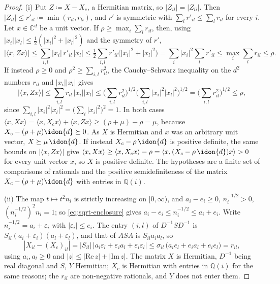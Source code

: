 \begin{proof}
(i) Put $Z\coloneqq X-X_c$, a Hermitian matrix, so $|Z_{il}|=|Z_{li}|$. Then
$|Z_{il}|\le r'_{il}\coloneqq\min(r_{il},r_{li})$, and $r'$ is symmetric with
$\sum_lr'_{il}\le\sum_lr_{il}$ for every $i$. Let $x\in\mathbb{C}^{d}$ be a
unit vector. If $\rho\ge\max_i\sum_lr_{il}$, then, using
$|x_i||x_l|\le\tfrac12(|x_i|^{2}+|x_l|^{2})$ and the symmetry of $r'$,
\begin{equation*}
  |\langle x,Zx\rangle|
  \le\sum_{i,l}|x_i|\,r'_{il}\,|x_l|
  \le\tfrac12\sum_{i,l}r'_{il}\big(|x_i|^{2}+|x_l|^{2}\big)
  =\sum_i|x_i|^{2}\sum_lr'_{il}
  \le\max_i\sum_lr_{il}\le\rho .
\end{equation*}
If instead $\rho\ge0$ and $\rho^{2}\ge\sum_{i,l}r_{il}^{2}$, the
Cauchy--Schwarz inequality on the $d^{2}$ numbers $r_{il}$ and
$|x_i||x_l|$ gives
\begin{equation*}
  |\langle x,Zx\rangle|\le\sum_{i,l}r_{il}\,|x_i||x_l|
  \le\Big(\sum_{i,l}r_{il}^{2}\Big)^{1/2}\Big(\sum_{i,l}|x_i|^{2}|x_l|^{2}\Big)^{1/2}
  =\Big(\sum_{i,l}r_{il}^{2}\Big)^{1/2}\le\rho ,
\end{equation*}
since $\sum_{i,l}|x_i|^{2}|x_l|^{2}=\big(\sum_i|x_i|^{2}\big)^{2}=1$. In both
cases $\langle x,Xx\rangle=\langle x,X_cx\rangle+\langle x,Zx\rangle
\ge(\rho+\mu)-\rho=\mu$, because $X_c-(\rho+\mu)\idon{d}\succeq0$. As $X$ is
Hermitian and $x$ was an arbitrary unit vector, $X\succeq\mu\,\idon{d}$. If
instead $X_c-\rho\,\idon{d}$ is positive definite, the same bounds on
$|\langle x,Zx\rangle|$ give
$\langle x,Xx\rangle\ge\langle x,X_cx\rangle-\rho
=\langle x,(X_c-\rho\,\idon{d})x\rangle>0$ for every unit vector $x$, so $X$
is positive definite. The
hypotheses are a finite set of comparisons of rationals and the positive
semidefiniteness of the matrix $X_c-(\rho+\mu)\idon{d}$ with entries in
$\mathbb{Q}(i)$.

(ii) The map $t\mapsto t^{2}n_i$ is strictly increasing on $[0,\infty)$, and
$a_i-e_i\ge0$, $n_i^{-1/2}>0$, $(n_i^{-1/2})^{2}n_i=1$; so
\eqref{eq:sqrt-enclosure} gives $a_i-e_i\le n_i^{-1/2}\le a_i+e_i$. Write
$n_i^{-1/2}=a_i+\varepsilon_i$ with $|\varepsilon_i|\le e_i$. The entry
$(i,l)$ of $D^{-1}SD^{-1}$ is
$S_{il}(a_i+\varepsilon_i)(a_l+\varepsilon_l)$, and that of $ASA$ is
$S_{il}a_ia_l$, so
\begin{equation*}
  |X_{il}-(X_c)_{il}|
  =|S_{il}|\,\big|a_i\varepsilon_l+\varepsilon_ia_l+\varepsilon_i\varepsilon_l\big|
  \le\sigma_{il}\,\big(a_ie_l+e_ia_l+e_ie_l\big)=r_{il},
\end{equation*}
using $a_i,a_l\ge0$ and $|z|\le|\mathrm{Re}\,z|+|\mathrm{Im}\,z|$. The matrix
$X$ is Hermitian, $D^{-1}$ being real diagonal and $S$, $Y$ Hermitian; $X_c$
is Hermitian with entries in $\mathbb{Q}(i)$ for the same reasons; the $r_{il}$
are non-negative rationals, and $Y$ does not enter them.


\end{proof}
